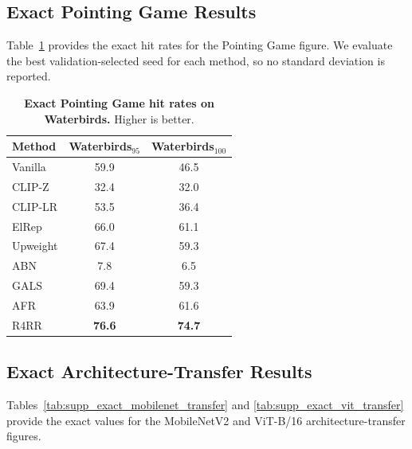 \documentclass[10pt,twocolumn,letterpaper]{article}
\begin{document}
\FloatBarrier


\subsection{Exact Pointing Game Results}
\label{appendix:exact_pointing_game}

Table~\ref{tab:supp_exact_pointing_game} provides the exact hit rates for the Pointing Game figure. We evaluate the best validation-selected seed for each method, so no standard deviation is reported.

\begin{table}[h]
\centering
\caption{\textbf{Exact Pointing Game hit rates on Waterbirds.} Higher is better.}
\label{tab:supp_exact_pointing_game}
\small
\setlength{\tabcolsep}{8pt}
\renewcommand{\arraystretch}{1.12}
\begin{tabular}{lcc}
\toprule
\textbf{Method} & \textbf{Waterbirds$_{95}$} & \textbf{Waterbirds$_{100}$} \\
\midrule
Vanilla & 59.9 & 46.5 \\
CLIP-Z & 32.4 & 32.0 \\
CLIP-LR & 53.5 & 36.4 \\
ElRep & 66.0 & 61.1 \\
Upweight & 67.4 & 59.3 \\
ABN & 7.8 & 6.5 \\
GALS & 69.4 & 59.3 \\
AFR & 63.9 & 61.6 \\
R4RR & \textbf{76.6} & \textbf{74.7} \\
\bottomrule
\end{tabular}
\end{table}


\subsection{Exact Architecture-Transfer Results}
\label{appendix:exact_architecture_transfer}

Tables~\ref{tab:supp_exact_mobilenet_transfer} and \ref{tab:supp_exact_vit_transfer} provide the exact values for the MobileNetV2 and ViT-B/16 architecture-transfer figures.
\end{document}
